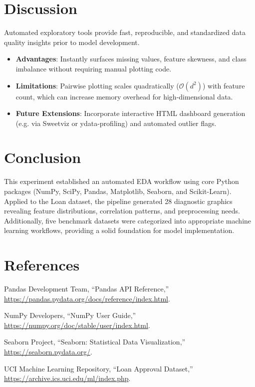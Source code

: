\documentclass[12pt,a4paper]{article}
\begin{document}
\section{Discussion}
Automated exploratory tools provide fast, reproducible, and standardized data quality insights prior to model development.
\begin{itemize}[noitemsep]
    \item \textbf{Advantages}: Instantly surfaces missing values, feature skewness, and class imbalance without requiring manual plotting code.
    \item \textbf{Limitations}: Pairwise plotting scales quadratically ($\mathcal{O}(d^2)$) with feature count, which can increase memory overhead for high-dimensional data.
    \item \textbf{Future Extensions}: Incorporate interactive HTML dashboard generation (e.g. via Sweetviz or ydata-profiling) and automated outlier flags.
\end{itemize}

\section{Conclusion}
This experiment established an automated EDA workflow using core Python packages (NumPy, SciPy, Pandas, Matplotlib, Seaborn, and Scikit-Learn). Applied to the Loan dataset, the pipeline generated 28 diagnostic graphics revealing feature distributions, correlation patterns, and preprocessing needs. Additionally, five benchmark datasets were categorized into appropriate machine learning workflows, providing a solid foundation for model implementation.

\section{References}
\begin{enumerate}[label={[\arabic*]}, leftmargin=2em]
    \item Pandas Development Team, ``Pandas API Reference,'' \url{https://pandas.pydata.org/docs/reference/index.html}.
    \item NumPy Developers, ``NumPy User Guide,'' \url{https://numpy.org/doc/stable/user/index.html}.
    \item Seaborn Project, ``Seaborn: Statistical Data Visualization,'' \url{https://seaborn.pydata.org/}.
    \item UCI Machine Learning Repository, ``Loan Approval Dataset,'' \url{https://archive.ics.uci.edu/ml/index.php}.
\end{enumerate}
\end{document}
